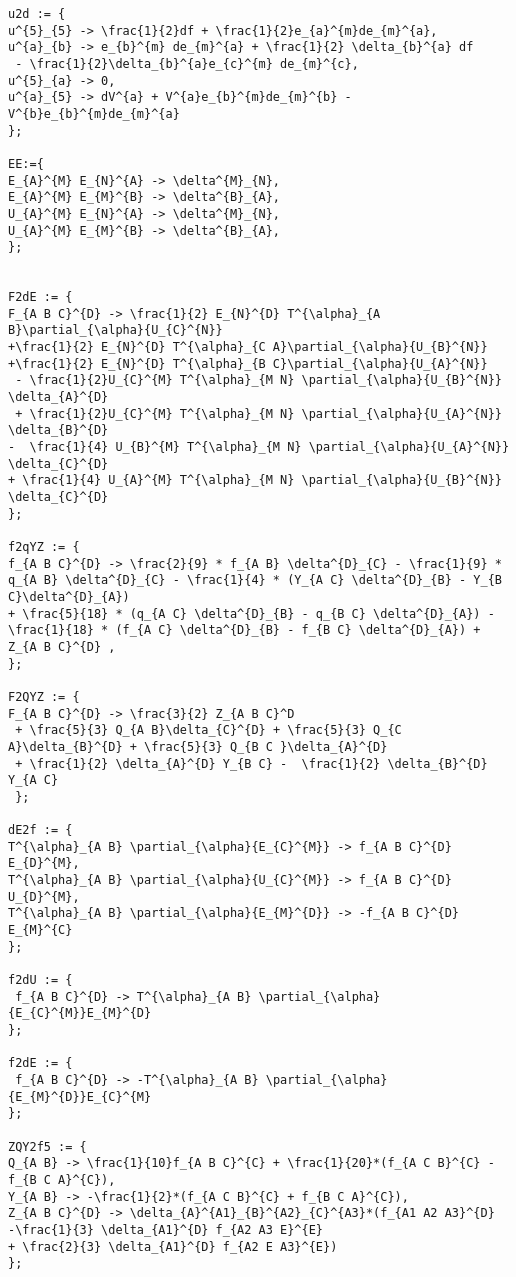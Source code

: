 \documentclass[11pt]{article}
\begin{document}
{\begin{verbatim}
u2d := {
u^{5}_{5} -> \frac{1}{2}df + \frac{1}{2}e_{a}^{m}de_{m}^{a},
u^{a}_{b} -> e_{b}^{m} de_{m}^{a} + \frac{1}{2} \delta_{b}^{a} df
 - \frac{1}{2}\delta_{b}^{a}e_{c}^{m} de_{m}^{c},
u^{5}_{a} -> 0,
u^{a}_{5} -> dV^{a} + V^{a}e_{b}^{m}de_{m}^{b} - V^{b}e_{b}^{m}de_{m}^{a}
};

EE:={
E_{A}^{M} E_{N}^{A} -> \delta^{M}_{N},
E_{A}^{M} E_{M}^{B} -> \delta^{B}_{A},
U_{A}^{M} E_{N}^{A} -> \delta^{M}_{N},
U_{A}^{M} E_{M}^{B} -> \delta^{B}_{A},
};


F2dE := {
F_{A B C}^{D} -> \frac{1}{2} E_{N}^{D} T^{\alpha}_{A B}\partial_{\alpha}{U_{C}^{N}}
+\frac{1}{2} E_{N}^{D} T^{\alpha}_{C A}\partial_{\alpha}{U_{B}^{N}}
+\frac{1}{2} E_{N}^{D} T^{\alpha}_{B C}\partial_{\alpha}{U_{A}^{N}}
 - \frac{1}{2}U_{C}^{M} T^{\alpha}_{M N} \partial_{\alpha}{U_{B}^{N}} \delta_{A}^{D}
 + \frac{1}{2}U_{C}^{M} T^{\alpha}_{M N} \partial_{\alpha}{U_{A}^{N}} \delta_{B}^{D}
-  \frac{1}{4} U_{B}^{M} T^{\alpha}_{M N} \partial_{\alpha}{U_{A}^{N}} \delta_{C}^{D}
+ \frac{1}{4} U_{A}^{M} T^{\alpha}_{M N} \partial_{\alpha}{U_{B}^{N}} \delta_{C}^{D}
};

f2qYZ := {
f_{A B C}^{D} -> \frac{2}{9} * f_{A B} \delta^{D}_{C} - \frac{1}{9} * q_{A B} \delta^{D}_{C} - \frac{1}{4} * (Y_{A C} \delta^{D}_{B} - Y_{B C}\delta^{D}_{A})
+ \frac{5}{18} * (q_{A C} \delta^{D}_{B} - q_{B C} \delta^{D}_{A}) - \frac{1}{18} * (f_{A C} \delta^{D}_{B} - f_{B C} \delta^{D}_{A}) + Z_{A B C}^{D} ,
};

F2QYZ := {
F_{A B C}^{D} -> \frac{3}{2} Z_{A B C}^D  
 + \frac{5}{3} Q_{A B}\delta_{C}^{D} + \frac{5}{3} Q_{C A}\delta_{B}^{D} + \frac{5}{3} Q_{B C }\delta_{A}^{D} 
 + \frac{1}{2} \delta_{A}^{D} Y_{B C} -  \frac{1}{2} \delta_{B}^{D} Y_{A C}
 };

dE2f := {
T^{\alpha}_{A B} \partial_{\alpha}{E_{C}^{M}} -> f_{A B C}^{D} E_{D}^{M},
T^{\alpha}_{A B} \partial_{\alpha}{U_{C}^{M}} -> f_{A B C}^{D} U_{D}^{M},
T^{\alpha}_{A B} \partial_{\alpha}{E_{M}^{D}} -> -f_{A B C}^{D} E_{M}^{C}
};

f2dU := {
 f_{A B C}^{D} -> T^{\alpha}_{A B} \partial_{\alpha}{E_{C}^{M}}E_{M}^{D}
};

f2dE := {
 f_{A B C}^{D} -> -T^{\alpha}_{A B} \partial_{\alpha}{E_{M}^{D}}E_{C}^{M}
};

ZQY2f5 := {
Q_{A B} -> \frac{1}{10}f_{A B C}^{C} + \frac{1}{20}*(f_{A C B}^{C} - f_{B C A}^{C}),
Y_{A B} -> -\frac{1}{2}*(f_{A C B}^{C} + f_{B C A}^{C}),
Z_{A B C}^{D} -> \delta_{A}^{A1}_{B}^{A2}_{C}^{A3}*(f_{A1 A2 A3}^{D}  -\frac{1}{3} \delta_{A1}^{D} f_{A2 A3 E}^{E} 
+ \frac{2}{3} \delta_{A1}^{D} f_{A2 E A3}^{E})
};


\end{verbatim}}
\end{document}
